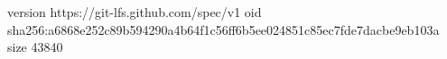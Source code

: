 version https://git-lfs.github.com/spec/v1
oid sha256:a6868e252c89b594290a4b64f1c56ff6b5ee024851c85ec7fde7dacbe9eb103a
size 43840
